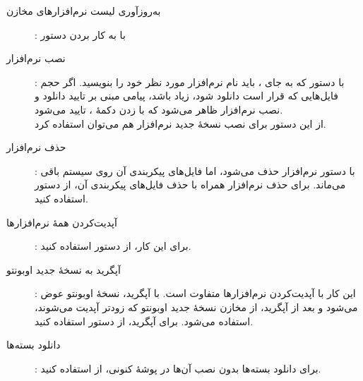 \begin{description}
\item [به‌روزآوری لیست نرم‌افزارهای مخازن]: با به کار بردن دستور 
\item [نصب نرم‌افزار]: با دستور  که به جای ، باید نام نرم‌افزار مورد نظر خود را بنویسید. اگر حجم فایل‌هایی که قرار است دانلود شود، زیاد باشد، پیامی مبنی بر تایید دانلود و نصب نرم‌افزار ظاهر می‌شود که با زدن دکمهٔ ، تایید می‌شود.\\
از این دستور برای نصب نسخهٔ جدید نرم‌افزار هم می‌توان استفاده کرد.
\item [حذف نرم‌افزار]: با دستور  نرم‌افزار حذف می‌شود، اما فایل‌های پیکربندی آن روی سیستم باقی می‌ماند. برای حذف نرم‌افزار همراه با حذف فایل‌های پیکربندی آن، از دستور  استفاده کنید.
\item [آپدیت‌کردن همهٔ نرم‌افزارها]: برای این کار، از دستور  استفاده کنید.
\item [آپگرید به نسخهٔ جدید اوبونتو]: این کار با آپدیت‌کردن نرم‌افزارها متفاوت است. با آپگرید، نسخهٔ اوبونتو عوض می‌شود و بعد از آپگرید، از مخازن نسخهٔ جدید اوبونتو که زودتر آپدیت می‌شوند، استفاده می‌شود. برای آپگرید، از دستور  استفاده کنید.
\item [دانلود بسته‌ها]: برای دانلود بسته‌ها بدون نصب آن‌ها در پوشهٔ کنونی، از  استفاده کنید.
\end{description}
